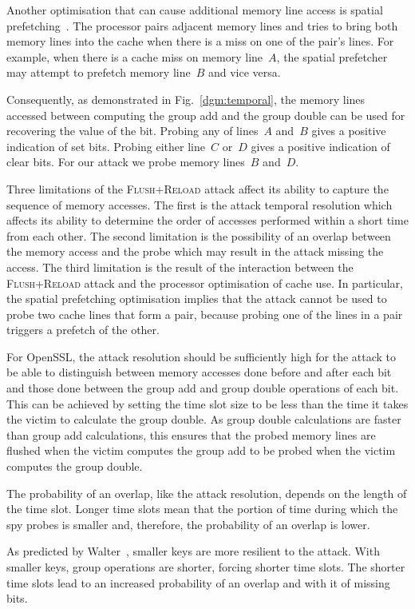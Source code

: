 \documentclass[twocolumn]{svjour3}
\newcommand{\fl}{\textsc{Flu\-sh+\allowbreak Re\-load}\xspace}
\begin{document}
Another optimisation that can cause additional memory line access is spatial prefetching~\cite{intel12optimization}.
The processor pairs adjacent memory lines and tries to bring both memory lines into the cache
when there is a miss on one of the pair's lines.
For example, when there is a cache miss on memory line~$A$, the spatial prefetcher may attempt to prefetch memory line~$B$
and vice versa.

Consequently, as demonstrated in Fig.~\ref{dgm:temporal}, the memory lines accessed between computing
the group add and the group double can be used for recovering the value of the bit.
Probing any of lines~$A$ and~$B$ gives a positive indication of set bits.  
Probing either line~$C$ or~$D$ gives a positive indication of clear bits.
For our attack we probe memory lines~$B$ and~$D$.

Three limitations of the \fl attack affect its ability to capture the sequence of memory accesses.
The first is the attack temporal resolution which affects its ability to 
determine the order of accesses performed within a short time from each other.
The second limitation is the possibility of an overlap between the memory access and the probe which may result
in the attack missing the access.
The third limitation is the result of the interaction between the \fl attack and the processor
optimisation of cache use.  
In particular, the spatial prefetching optimisation implies that the attack cannot be used to probe two cache lines that form a pair,
because probing one of the lines in a pair triggers a prefetch of the other.



For OpenSSL, the attack resolution should be sufficiently high for the attack to be able to distinguish between 
memory accesses done before and after each bit and those done between the group add and group double operations of each bit.
This can be achieved by setting the time slot size to be less than the time it takes the victim to calculate the group double.
As group double calculations are faster than group add calculations, this ensures that the probed memory lines are flushed
when the victim computes the group add to be probed when the victim computes the group double.

The probability of an overlap, like the attack resolution, depends on the length of the time slot.
Longer time slots mean that the portion of time during which the spy probes is smaller and, therefore, 
the probability of an overlap is lower.

As predicted by Walter~\cite{walter04longer}, smaller keys are more resilient to the attack.
With smaller keys, group operations are shorter, forcing shorter time slots.
The shorter time slots lead to an increased probability of an overlap and with it of missing bits.
\end{document}
